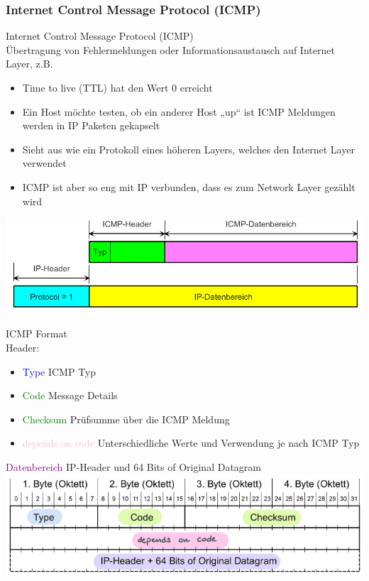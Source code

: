 \subsubsection{Internet Control Message Protocol (ICMP)}

\begin{concept}{Internet Control Message Protocol (ICMP)}\\
    Übertragung von Fehlermeldungen oder Informationsaustausch auf Internet Layer, z.B.
    \begin{itemize}
        \item Time to live (TTL) hat den Wert 0 erreicht
        \item Ein Host möchte testen, ob ein anderer Host „up“ ist ICMP Meldungen werden in IP Paketen gekapselt
        \item Sieht aus wie ein Protokoll eines höheren Layers, welches den Internet Layer verwendet
        \item ICMP ist aber so eng mit IP verbunden, dass es zum Network Layer gezählt wird
    \end{itemize}
        \includegraphics[width=0.75\linewidth]{images/icmp.png}
\end{concept}

\begin{KR}{ICMP Format}\\
    Header:
    \begin{itemize}
        \item \textcolor{blue}{Type} ICMP Typ
        \item \textcolor{green}{Code} Message Details
        \item \textcolor{green}{Checksum} Prüfsumme über die ICMP Meldung
        \item \textcolor{pink}{depends on code} Unterschiedliche Werte und Verwendung je nach ICMP Typ
    \end{itemize}
    \textcolor{purple}{Datenbereich} IP-Header und 64 Bits of Original Datagram
    \includegraphics[width=1\linewidth]{images/icmp_details.png}
\end{KR}

